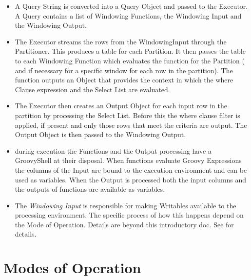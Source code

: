 \documentclass[pdftex,10pt,a4paper]{article}
\begin{document}
  \begin{itemize}
  \item A Query String is converted into a Query Object and passed to
    the Executor. A Query contains a list of Windowing Functions, the
    Windowing Input and the Windowing Output.
  \item The Executor streams the rows from the WindowingInput through
    the Partitioner. This produces a table for each Partition. It then
    passes the table to each Windowing Function which evaluates the
    function for the Partition ( and if necessary for a specific
    window for each row in the partition). The function outputs an
    Object that provides the context in which the where Clause
    expression and the Select List are evaluated.
  \item The Executor then creates an Output Object for each input row
   in the partition by processing the Select List. Before this the
   where clause filter is applied, if present and only those rows that
   meet the criteria are output. The Output Object  is then passed to
   the Windowing Output.
  \item during execution the Functions and the Output processing have
    a GroovyShell at their disposal. When functions evaluate Groovy
    Expressions the columns of the Input are bound to the execution
    environment and can be used as variables. When the Output is
    processed both the input columns and the outputs of functions are available as variables.
  \item The {\em Windowing Input} is responsible for making Writables
    available to the processing environment. The specific process of
    how this happens depend on the Mode of Operation. Details are
    beyond this introductory doc. See \cite{wndwi} for details.
  \end{itemize}

\section{Modes of Operation}
\end{document}

